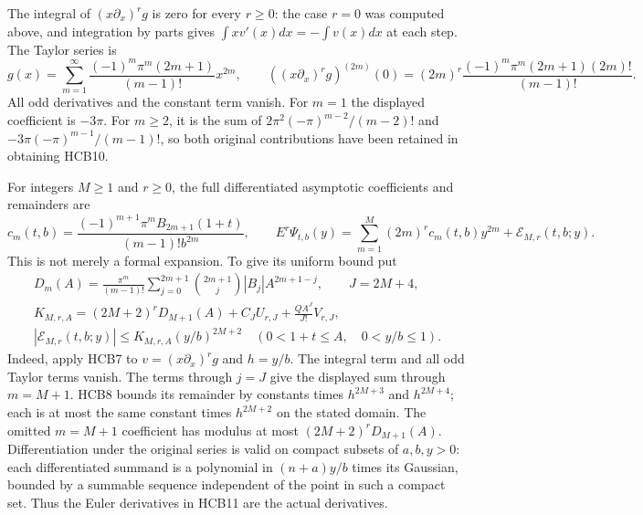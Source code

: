 \documentclass[11pt]{article}
\begin{document}
The integral of $(x\partial_x)^r g$ is zero for every $r\geq0$:
the case $r=0$ was computed above, and integration by parts gives
$\int x v'(x)dx=-\int v(x)dx$ at each step. The Taylor series is
\begin{equation}\tag{HCB10}
 g(x)=\sum_{m=1}^{\infty}
       \frac{(-1)^m\pi^m(2m+1)}{(m-1)!}x^{2m},\qquad
 ((x\partial_x)^rg)^{(2m)}(0)
       =(2m)^r\frac{(-1)^m\pi^m(2m+1)(2m)!}{(m-1)!}.
\end{equation}
All odd derivatives and the constant term vanish. For $m=1$ the
displayed coefficient is $-3\pi$. For $m\geq2$, it is the sum of
$2\pi^2(-\pi)^{m-2}/(m-2)!$ and
$-3\pi(-\pi)^{m-1}/(m-1)!$, so both original contributions have
been retained in obtaining HCB10.

For integers $M\geq1$ and $r\geq0$, the full differentiated
asymptotic coefficients and remainders are
\begin{equation}\tag{HCB11}
 c_m(t,b)=\frac{(-1)^{m+1}\pi^m B_{2m+1}(1+t)}{(m-1)!b^{2m}},
 \qquad
 E^r\Psi_{t,b}(y)=\sum_{m=1}^{M}(2m)^r c_m(t,b)y^{2m}
                       +\mathcal E_{M,r}(t,b;y).
\end{equation}
This is not merely a formal expansion. To give its uniform bound put
\begin{equation}\tag{HCB12}
\begin{gathered}
 D_m(A)=\frac{\pi^m}{(m-1)!}
       \sum_{j=0}^{2m+1}\binom{2m+1}{j}|B_j|A^{2m+1-j},
 \qquad J=2M+4,\\
 K_{M,r,A}=(2M+2)^rD_{M+1}(A)+C_JU_{r,J}
                         +\frac{QA^J}{J!}V_{r,J},\\
 |\mathcal E_{M,r}(t,b;y)|
       \leq K_{M,r,A}(y/b)^{2M+2}
 \quad(0<1+t\leq A,\quad0<y/b\leq1).
\end{gathered}
\end{equation}
Indeed, apply HCB7 to $v=(x\partial_x)^rg$ and $h=y/b$.
The integral term and all odd Taylor terms vanish. The terms through
$j=J$ give the displayed sum through $m=M+1$. HCB8 bounds its
remainder by constants times $h^{2M+3}$ and $h^{2M+4}$; each is
at most the same constant times $h^{2M+2}$ on the stated domain.
The omitted $m=M+1$ coefficient has modulus at most
$(2M+2)^rD_{M+1}(A)$. Differentiation under the original series is
valid on compact subsets of $a,b,y>0$: each differentiated summand
is a polynomial in $(n+a)y/b$ times its Gaussian, bounded by a
summable sequence independent of the point in such a compact set.
Thus the Euler derivatives in HCB11 are the actual derivatives.
\end{document}
